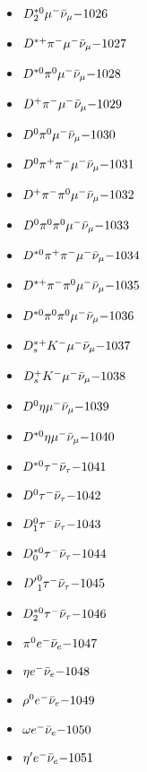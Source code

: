 \begin{multicols}{3}
\begin{itemize}
 \item $ D_{2}^{*0} \mu^{-} \bar{\nu}_{\mu} \hfill{-1026}$
 \item $ D^{*+} \pi^{-} \mu^{-} \bar{\nu}_{\mu} \hfill{-1027}$
 \item $ D^{*0} \pi^{0} \mu^{-} \bar{\nu}_{\mu} \hfill{-1028}$
 \item $ D^{+} \pi^{-} \mu^{-} \bar{\nu}_{\mu} \hfill{-1029}$
 \item $ D^{0} \pi^{0} \mu^{-} \bar{\nu}_{\mu} \hfill{-1030}$
 \item $ D^{0} \pi^{+} \pi^{-} \mu^{-} \bar{\nu}_{\mu} \hfill{-1031}$
 \item $ D^{+} \pi^{-} \pi^{0} \mu^{-} \bar{\nu}_{\mu} \hfill{-1032}$
 \item $ D^{0} \pi^{0} \pi^{0} \mu^{-} \bar{\nu}_{\mu} \hfill{-1033}$
 \item $ D^{*0} \pi^{+} \pi^{-} \mu^{-} \bar{\nu}_{\mu} \hfill{-1034}$
 \item $ D^{*+} \pi^{-} \pi^{0} \mu^{-} \bar{\nu}_{\mu} \hfill{-1035}$
 \item $ D^{*0} \pi^{0} \pi^{0} \mu^{-} \bar{\nu}_{\mu} \hfill{-1036}$
 \item $ D_{s}^{*+} K^{-} \mu^{-} \bar{\nu}_{\mu} \hfill{-1037}$
 \item $ D_{s}^{+} K^{-} \mu^{-} \bar{\nu}_{\mu} \hfill{-1038}$
 \item $ D^{0} \eta \mu^{-} \bar{\nu}_{\mu} \hfill{-1039}$
 \item $ D^{*0} \eta \mu^{-} \bar{\nu}_{\mu} \hfill{-1040}$
 \item $ D^{*0} \tau^{-} \bar{\nu}_{\tau} \hfill{-1041}$
 \item $ D^{0} \tau^{-} \bar{\nu}_{\tau} \hfill{-1042}$
 \item $ D_{1}^{0} \tau^{-} \bar{\nu}_{\tau} \hfill{-1043}$
 \item $ D_{0}^{*0} \tau^{-} \bar{\nu}_{\tau} \hfill{-1044}$
 \item $ {D^{\prime}}_{1}^{0} \tau^{-} \bar{\nu}_{\tau} \hfill{-1045}$
 \item $ D_{2}^{*0} \tau^{-} \bar{\nu}_{\tau} \hfill{-1046}$
 \item $ \pi^{0} e^{-} \bar{\nu}_{e} \hfill{-1047}$
 \item $ \eta e^{-} \bar{\nu}_{e} \hfill{-1048}$
 \item $ \rho^{0} e^{-} \bar{\nu}_{e} \hfill{-1049}$
 \item $ \omega e^{-} \bar{\nu}_{e} \hfill{-1050}$
 \item $ {\eta^{\prime}} e^{-} \bar{\nu}_{e} \hfill{-1051}$

\end{itemize}
\end{multicols}
